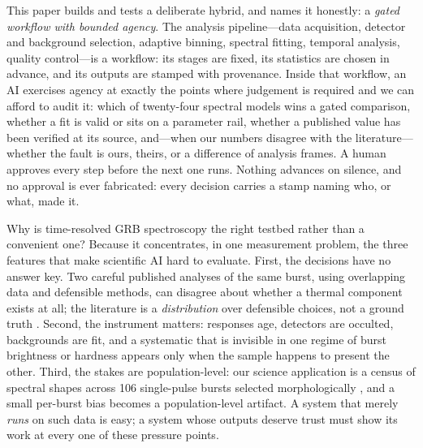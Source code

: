 \documentclass[twocolumn]{aastex631}
\begin{document}
This paper builds and tests a deliberate hybrid, and names it honestly: a
\emph{gated workflow with bounded agency}. The analysis pipeline---data
acquisition, detector and background selection, adaptive binning, spectral
fitting, temporal analysis, quality control---is a workflow: its stages are
fixed, its statistics are chosen in advance, and its outputs are stamped
with provenance. Inside that workflow, an AI exercises agency at exactly the
points where judgement is required and we can afford to audit it: which of
twenty-four spectral models wins a gated comparison, whether a fit is valid
or sits on a parameter rail, whether a published value has been verified at
its source, and---when our numbers disagree with the literature---whether the
fault is ours, theirs, or a difference of analysis frames. A human approves
every step before the next one runs. Nothing advances on silence, and no
approval is ever fabricated: every decision carries a stamp naming who, or
what, made it.

Why is time-resolved GRB spectroscopy the right testbed rather than a
convenient one? Because it concentrates, in one measurement problem, the
three features that make scientific AI hard to evaluate. First, the
decisions have no answer key. Two careful published analyses of the same
burst, using overlapping data and defensible methods, can disagree about
whether a thermal component exists at all; the literature is a
\emph{distribution} over defensible choices, not a ground truth
\citep{2022ApJ...938..159S,2019ApJ...887...13F}. Second, the instrument
matters: responses age, detectors are occulted, backgrounds are fit, and a
systematic that is invisible in one regime of burst brightness or hardness
appears only when the sample happens to present the other. Third, the
stakes are population-level: our science application is a census of
spectral shapes across 106 single-pulse bursts selected morphologically
\citep{2024ApJ...972...83B}, and a small per-burst bias becomes a
population-level artifact. A system that merely \emph{runs} on such data is
easy; a system whose outputs deserve trust must show its work at every one
of these pressure points.
\end{document}
